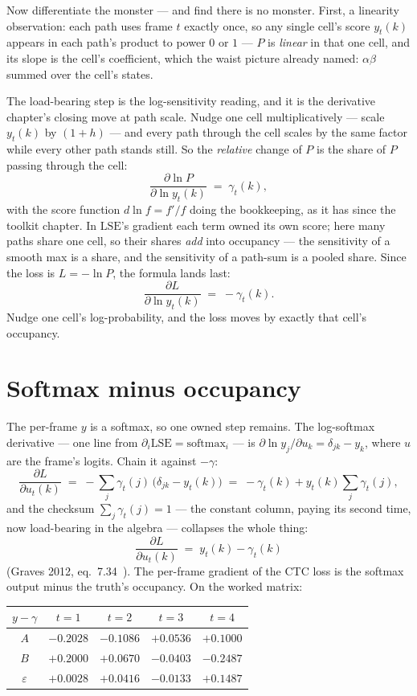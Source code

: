 \begin{narrative}
Now differentiate the monster — and find there is no monster. First,
a linearity observation: each path uses frame $t$ exactly once, so
any single cell's score $y_t(k)$ appears in each path's product to
power $0$ or $1$ — $P$ is \emph{linear} in that one cell, and its
slope is the cell's coefficient, which the waist picture already
named: $\alpha \beta$ summed over the cell's states.

The load-bearing step is the log-sensitivity reading, and it is the
derivative chapter's closing move at path scale. Nudge one cell
multiplicatively — scale $y_t(k)$ by $(1 + h)$ — and every path
through the cell scales by the same factor while every other path
stands still. So the \emph{relative} change of $P$ is the share of
$P$ passing through the cell:
\[
  \frac{\partial \ln P}{\partial \ln y_t(k)} \;=\; \gamma_t(k) ,
\]
with the score function $d \ln f = f'/f$ doing the bookkeeping, as
it has since the toolkit chapter. In $\mathrm{LSE}$'s gradient each
term owned its own score; here many paths share one cell, so their
shares \emph{add} into occupancy — the sensitivity of a smooth max
is a share, and the sensitivity of a path-sum is a pooled share.
Since the loss is $L = -\ln P$, the formula lands last:
\[
  \frac{\partial L}{\partial \ln y_t(k)} \;=\; -\gamma_t(k) .
\]
Nudge one cell's log-probability, and the loss moves by exactly that
cell's occupancy.

\section{Softmax minus occupancy}

The per-frame $y$ is a softmax, so one owned step remains. The
log-softmax derivative — one line from
$\partial_i \mathrm{LSE} = \mathrm{softmax}_i$ — is
$\partial \ln y_j / \partial u_k = \delta_{jk} - y_k$, where $u$ are
the frame's logits. Chain it against $-\gamma$:
\[
  \frac{\partial L}{\partial u_t(k)}
  \;=\; -\sum_j \gamma_t(j)\,\bigl(\delta_{jk} - y_t(k)\bigr)
  \;=\; -\gamma_t(k) + y_t(k) \sum_j \gamma_t(j) ,
\]
and the checksum $\sum_j \gamma_t(j) = 1$ — the constant column,
paying its second time, now load-bearing in the algebra — collapses
the whole thing:
\[
  \boxed{\;\frac{\partial L}{\partial u_t(k)}
    \;=\; y_t(k) - \gamma_t(k)\;}
\]
(Graves 2012, eq.\ 7.34~\cite{deep_learning-alex-graves-supervised-sequence-labelling-with-rnns-2012}).
The per-frame gradient of the CTC loss is the softmax output minus
the truth's occupancy. On the worked matrix:

\begin{center}
\begin{tabular}{c|cccc}
$y - \gamma$ & $t=1$ & $t=2$ & $t=3$ & $t=4$ \\
\hline
$A$ & $-0.2028$ & $-0.1086$ & $+0.0536$ & $+0.1000$ \\
$B$ & $+0.2000$ & $+0.0670$ & $-0.0403$ & $-0.2487$ \\
$\varepsilon$ & $+0.0028$ & $+0.0416$ & $-0.0133$ & $+0.1487$ \\
\end{tabular}
\end{center}


\end{narrative}
